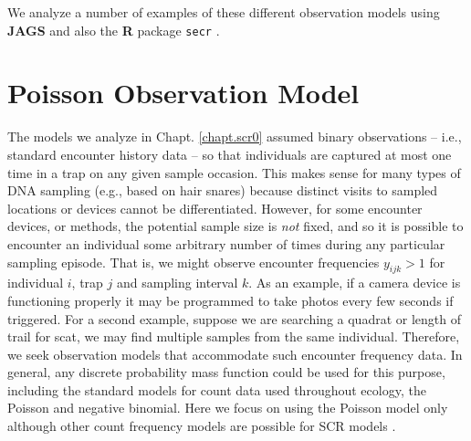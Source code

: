 We analyze a number of examples of these different observation models
using {\bf JAGS} and also the {\bf R}
package \mbox{\tt secr} \citep{efford:2011}.




\section{Poisson Observation Model}
\label{poisson-mn.sec.poisson}

The models we analyze in Chapt. \ref{chapt.scr0} assumed binary
observations -- i.e., standard encounter history data -- so
that individuals are captured at most one time in a trap on any given
sample occasion.  This makes
sense for many types of DNA sampling (e.g., based on hair snares)
because distinct visits to sampled locations or devices cannot be
differentiated. However, for some encounter devices, or methods, the
potential sample size is {\it not} fixed, and so it is 
possible to encounter an individual some arbitrary number of times
during any particular sampling episode.
That is, we might observe
encounter frequencies $y_{ijk}>1$
for individual $i$, trap $j$ and
sampling interval $k$.  As an example, if a camera device is
functioning properly it may be programmed to take photos every few
seconds if triggered.  For a second example, suppose we are searching
a quadrat or length of trail for scat, we may find multiple samples from the same
individual.
Therefore, we seek observation models that accommodate such encounter
frequency data.  In general, any discrete probability mass function
could be used for this purpose, including the standard models for
count data used throughout ecology, the Poisson and negative
binomial.  Here we focus on using the Poisson
model only although other count frequency models are possible for SCR models 
\citep{efford_etal:2009ecol}.

